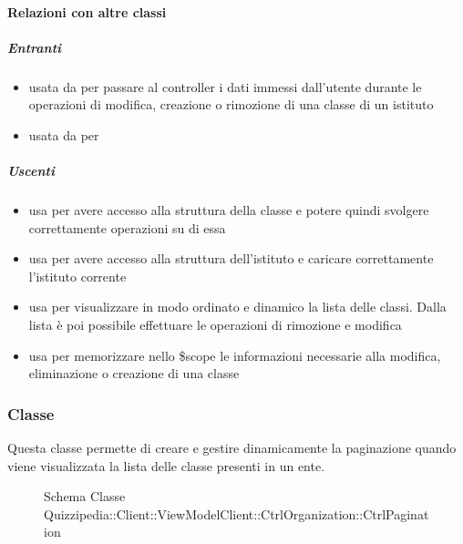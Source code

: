 \paragraph{Relazioni con altre classi}
\subparagraph{Entranti}
\begin{itemize}
\item usata da  per passare al controller i dati immessi dall'utente durante le operazioni di modifica, creazione o rimozione di una classe di un istituto
\item usata da  per 
\end{itemize}
\subparagraph{Uscenti}
\begin{itemize}
\item usa  per avere
accesso alla struttura della classe e potere quindi svolgere correttamente operazioni su di
essa
\item usa  per avere accesso alla struttura dell'istituto e caricare correttamente l'istituto corrente
\item usa  per visualizzare in modo ordinato e dinamico la lista delle classi. Dalla lista è poi possibile effettuare le operazioni di rimozione e modifica
\item usa  per memorizzare nello \$scope le informazioni necessarie alla modifica, eliminazione o creazione di una classe
\end{itemize}
\subsubsection{Classe }
Questa classe permette di creare e gestire dinamicamente la paginazione quando viene visualizzata la lista delle classe presenti in un ente.
\begin{figure}[H]
\centering
\noindent{}
\caption[Schema Classe CtrlPagination]{Schema Classe Quizzipedia::Client::ViewModelClient::CtrlOrganization::CtrlPagination}
\end{figure}
